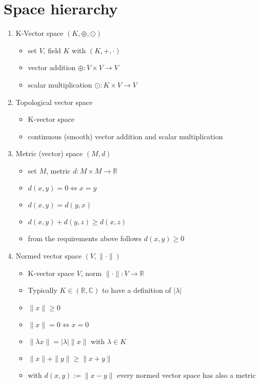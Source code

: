 \documentclass[../main.tex]{subfiles}
\begin{document}
\section{Space hierarchy}
\begin{enumerate}
    \item K-Vector space $(K,\oplus,\odot)$ 
        \begin{itemize}
            \item set $V$, field $K$ with $(K,+,\cdot)$
            \item vector addition $\oplus: V\times V\rightarrow V$
            \item scalar multiplication $\odot: K\times V\rightarrow V$
        \end{itemize}
    \item Topological vector space
        \begin{itemize}
            \item K-vector space
            \item continuous (smooth) vector addition and scalar multiplication
        \end{itemize}
    \item Metric (vector) space $(M,d)$
        \begin{itemize}
            \item set $M$, metric $d: M\times M\rightarrow \mathbb{R}$
            \item $d(x,y)=0 \Leftrightarrow x=y$
            \item $d(x,y)=d(y,x)$
            \item $d(x,y)+d(y,z) \ge d(x,z)$
            \item from the requirements above follows $d(x,y)\ge0$
        \end{itemize}
    \item Normed vector space $(V,\|\cdot\|)$
        \begin{itemize}
            \item K-vector space $V$, norm $\|\cdot\|: V\rightarrow \mathbb{R}$
            \item Typically $K\in(\mathbb{R}, \mathbb{C})$ to have a definition of $|\lambda|$
            \item $\|x\|\ge0$
            \item $\|x\|=0 \Leftrightarrow x=0$
            \item $\|\lambda x\|=|\lambda| \|x\|$ with $\lambda\in K$
            \item $\|x\|+\|y\|\ge\|x+y\|$
            \item with $d(x,y):=\|x-y\|$ every normed vector space has also a metric

\end{itemize}
\end{enumerate}
\end{document}
